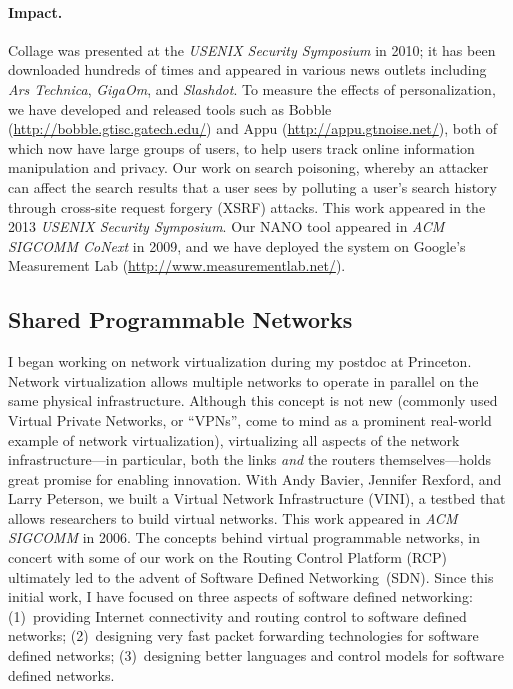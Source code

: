 \documentclass{article}
\begin{document}
\paragraph{Impact.}
Collage was presented at the {\em USENIX Security Symposium} in 2010; it
has been downloaded hundreds of times and appeared in various news
outlets including {\em Ars Technica}, {\em GigaOm}, and {\em Slashdot}.
To measure the effects of personalization, we have developed and
released tools such as Bobble (\url {http://bobble.gtisc.gatech.edu/})
and Appu (\url{http://appu.gtnoise.net/}), both of which now have large
groups of users, to help users track online information manipulation and
privacy.  Our work on search poisoning, whereby an attacker can affect
the search results that a user sees by polluting a user's search history
through cross-site request forgery (XSRF) attacks.  This work appeared
in the 2013 {\em USENIX Security Symposium}.  Our NANO tool appeared in
{\em ACM SIGCOMM CoNext} in 2009, and we have deployed the system on
Google's Measurement Lab (\url{http://www.measurementlab.net/}).


\subsection*{Shared Programmable Networks}

I began working on network virtualization during my
postdoc at Princeton.  Network virtualization allows multiple networks
to operate in parallel on the same physical infrastructure.  Although
this concept is not new (commonly used Virtual Private Networks, or
``VPNs'', come to mind as a prominent real-world example of network
virtualization), virtualizing all aspects of the network
infrastructure---in particular, both the links {\em and} the routers
themselves---holds great promise for enabling innovation.  With Andy
Bavier, Jennifer Rexford, and Larry Peterson, we built a Virtual Network
Infrastructure (VINI), a testbed that allows researchers to build
virtual networks.  This work appeared in {\em ACM SIGCOMM} in 2006.  The
concepts behind virtual programmable networks, in concert with some of
our work on the Routing Control Platform (RCP) ultimately led to the
advent of Software Defined Networking~(SDN).  Since this initial work, I
have focused on three aspects of software defined networking:
(1)~providing Internet connectivity and routing control to software
defined networks; (2)~designing very fast packet forwarding technologies
for software defined networks; (3)~designing better languages and
control models for software defined networks.
\end{document}
